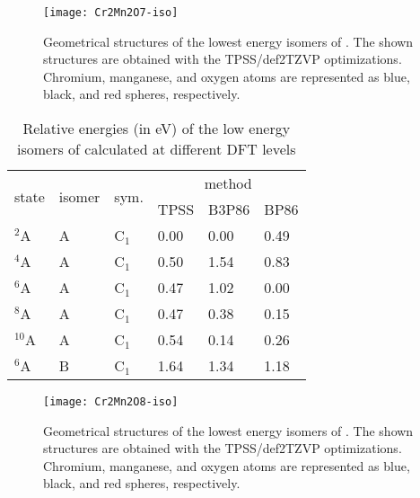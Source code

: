 \begin{figure}
	\centering
	\texttt{[image: Cr2Mn2O7-iso]}
	\caption{Geometrical structures of the lowest energy isomers of . The shown structures are obtained with the TPSS/def2TZVP optimizations. Chromium, manganese, and oxygen atoms are represented as blue, black, and red spheres, respectively.}
	\label{figs:Cr2Mn2O7}
\end{figure}







\begin{table}[]
	\centering
	\caption{Relative energies (in eV) of the low energy isomers of  calculated at different DFT levels}
\begin{tabular}{@{}llllll@{}}
\toprule
\multirow{2}{*}{state} & \multirow{2}{*}{isomer} & \multirow{2}{*}{sym.} & \multicolumn{3}{c}{method} \\ \cmidrule(l){4-6} 
         &        &         & TPSS   & B3P86 & BP86   \\ \midrule
$^2$A    & A      & C$_1$   & 0.00   & 0.00  & 0.49 \\
$^4$A    & A      & C$_1$   & 0.50   & 1.54  & 0.83 \\
$^6$A    & A      & C$_1$   & 0.47   & 1.02  & 0.00 \\
$^8$A    & A      & C$_1$   & 0.47   & 0.38  & 0.15 \\
$^{10}$A & A      & C$_1$   & 0.54   & 0.14  & 0.26 \\
$^6$A    & B      & C$_1$   & 1.64   & 1.34  & 1.18 \\ \bottomrule
\end{tabular}
\label{tbl:Cr2Mn2O8}
\end{table}	


\begin{figure}
	\centering
	\texttt{[image: Cr2Mn2O8-iso]}
	\caption{Geometrical structures of the lowest energy isomers of . The shown structures are obtained with the TPSS/def2TZVP optimizations. Chromium, manganese, and oxygen atoms are represented as blue, black, and red spheres, respectively.}
	\label{figs:Cr2Mn2O8}
\end{figure}






